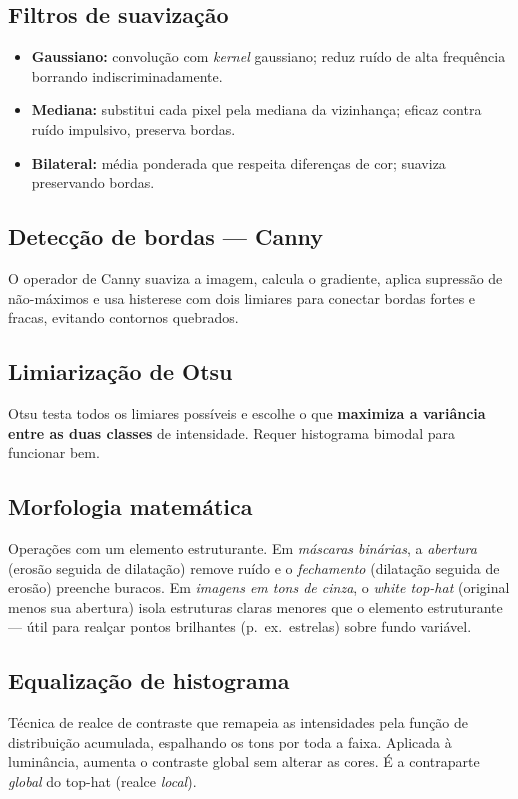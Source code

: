 \documentclass[12pt,a4paper]{article}
\begin{document}
\subsection{Filtros de suavização}
\begin{itemize}
  \item \textbf{Gaussiano:} convolução com \emph{kernel} gaussiano; reduz ruído de alta
        frequência borrando indiscriminadamente.
  \item \textbf{Mediana:} substitui cada pixel pela mediana da vizinhança; eficaz contra ruído
        impulsivo, preserva bordas.
  \item \textbf{Bilateral:} média ponderada que respeita diferenças de cor; suaviza preservando
        bordas.
\end{itemize}

\subsection{Detecção de bordas --- Canny}
O operador de Canny suaviza a imagem, calcula o gradiente, aplica supressão de não-máximos e
usa histerese com dois limiares para conectar bordas fortes e fracas, evitando contornos
quebrados.

\subsection{Limiarização de Otsu}
Otsu testa todos os limiares possíveis e escolhe o que \textbf{maximiza a variância entre as
duas classes} de intensidade. Requer histograma bimodal para funcionar bem.

\subsection{Morfologia matemática}
Operações com um elemento estruturante. Em \emph{máscaras binárias}, a \emph{abertura}
(erosão seguida de dilatação) remove ruído e o \emph{fechamento} (dilatação seguida de erosão)
preenche buracos. Em \emph{imagens em tons de cinza}, o \emph{white top-hat} (original menos sua
abertura) isola estruturas claras menores que o elemento estruturante --- útil para realçar
pontos brilhantes (p.~ex.\ estrelas) sobre fundo variável.

\subsection{Equalização de histograma}
Técnica de realce de contraste que remapeia as intensidades pela função de distribuição acumulada,
espalhando os tons por toda a faixa. Aplicada à luminância, aumenta o contraste global sem alterar
as cores. É a contraparte \emph{global} do top-hat (realce \emph{local}).
\end{document}
